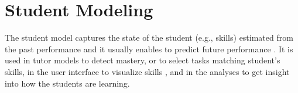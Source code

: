 %



\section{Student Modeling}
\label{sec:student-modeling}

The student model captures the state of the student (e.g., skills) estimated from the
past performance and it usually enables to predict future performance
\cite{student-models-review-2012, pelanek-learner-modeling,its-learner-models}.
It is used in tutor models to detect mastery, or to select tasks matching
student's skills, in the user interface to visualize skills \cite{instructor-dashboard-realtime},
and in the analyses to get insight into how the students are learning.  %

